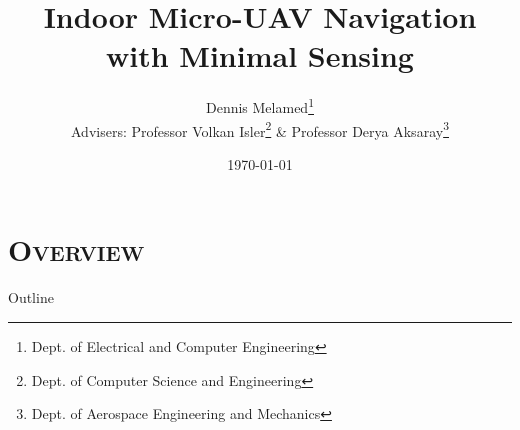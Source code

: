\documentclass[xcolor=x11names,compress]{beamer}
\begin{document}
\nobibliography*
\title{Indoor Micro-UAV Navigation with Minimal Sensing}
\author{
	Dennis Melamed\footnote{Dept. of Electrical and Computer Engineering}\\
	Advisers: Professor Volkan Isler\footnote{Dept. of Computer Science and Engineering} \& Professor Derya Aksaray\footnote{Dept. of Aerospace Engineering and Mechanics}\\
}
\date{\today}

{%
  \begin{frame}
    \titlepage
  \end{frame}
}

\section{\scshape Overview}
\begin{frame}{Outline}
\tableofcontents
\end{frame}
\end{document}
